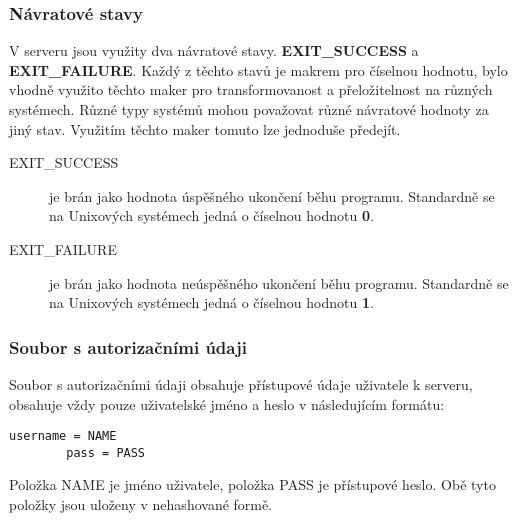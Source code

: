\documentclass[11pt,a4paper]{report}
\begin{document}
    \subsubsection{Návratové stavy}
    V serveru jsou využity dva návratové stavy. \textbf{EXIT\_SUCCESS} a \textbf{EXIT\_FAILURE}. Každý z těchto stavů je makrem pro číselnou hodnotu, bylo vhodně využito těchto maker pro transformovanost a přeložitelnost na různých systémech. Různé typy systémů mohou považovat různé návratové hodnoty za jiný stav. Využitím těchto maker tomuto lze jednoduše předejít.
    \begin{description}
        \item [EXIT\_SUCCESS] je brán jako hodnota úspěšného ukončení běhu programu. Standardně se na Unixových systémech jedná o číselnou hodnotu \textbf{0}.
        \label{itm:exitsuccess}
        \item [EXIT\_FAILURE] je brán jako hodnota neúspěšného ukončení běhu programu. Standardně se na Unixových systémech jedná o číselnou hodnotu \textbf{1}.
        \label{itm:exitfailure}
    \end{description}
    \subsubsection{Soubor s autorizačními údaji}
    \label{subsec:authconfig}
    Soubor s autorizačními údaji obsahuje přístupové údaje uživatele k serveru, obsahuje vždy pouze uživatelské jméno a heslo v následujícím formátu:
    \begin{lstlisting}[frame=trBL]
        username = NAME
        pass = PASS
    \end{lstlisting}\par
    Položka NAME je jméno uživatele, položka PASS je přístupové heslo. Obě tyto položky jsou uloženy v nehashované formě.
\end{document}
